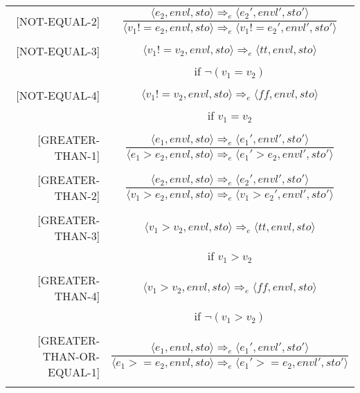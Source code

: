 \begin{longtable}[c] { r c }
  [NOT-EQUAL-2] & \( 
    \dfrac { \langle e_2, envl, sto \rangle \Rightarrow_e \langle e_2', envl', sto' \rangle }
      { \langle v_1 != e_2, envl, sto \rangle \Rightarrow_e \langle v_1 != e_2', envl', sto' \rangle } \)
  \\
  & \\

  [NOT-EQUAL-3] & \( 
    \langle v_1 != v_2, envl, sto \rangle \Rightarrow_e \langle tt, envl, sto \rangle \)
  \\
  & if \( \neg(v_1 = v_2) \) \\
  & \\

  [NOT-EQUAL-4] & \( 
    \langle v_1 != v_2, envl, sto \rangle \Rightarrow_e \langle ff, envl, sto \rangle \)
  \\
  & if \( v_1 = v_2 \) \\
  & \\

  [GREATER-THAN-1] & \( 
    \dfrac { \langle e_1, envl, sto \rangle \Rightarrow_e \langle e_1', envl', sto' \rangle }
      { \langle e_1 > e_2, envl, sto \rangle \Rightarrow_e \langle e_1' > e_2, envl', sto' \rangle } \)
  \\
  & \\

  [GREATER-THAN-2] & \( 
    \dfrac { \langle e_2, envl, sto \rangle \Rightarrow_e \langle e_2', envl', sto' \rangle }
      { \langle v_1 > e_2, envl, sto \rangle \Rightarrow_e \langle v_1 > e_2', envl', sto' \rangle } \)
  \\
  & \\

  [GREATER-THAN-3] & \( 
    \langle v_1 > v_2, envl, sto \rangle \Rightarrow_e \langle tt, envl, sto \rangle \)
  \\
  & if \( v_1 > v_2 \) \\
  & \\

  [GREATER-THAN-4] & \( 
    \langle v_1 > v_2, envl, sto \rangle \Rightarrow_e \langle ff, envl, sto \rangle \)
  \\
  & if \( \neg(v_1 > v_2) \) \\
  & \\

  [GREATER-THAN-OR-EQUAL-1] & \( 
    \dfrac { \langle e_1, envl, sto \rangle \Rightarrow_e \langle e_1', envl', sto' \rangle }
      { \langle e_1 > = e_2, envl, sto \rangle \Rightarrow_e \langle e_1' > = e_2, envl', sto' \rangle } \)
  \\
  & \\


\end{longtable}
